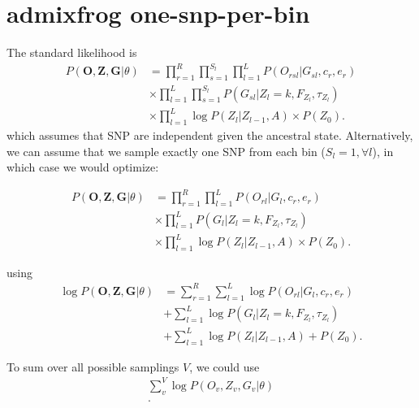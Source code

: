 \documentclass[10pt,a4paper]{article}
\newcommand{\BFZ}{\mathbf{Z}}
\newcommand{\BFG}{\mathbf{G}}
\newcommand{\BFO}{\mathbf{O}}
\begin{document}
\section{admixfrog one-snp-per-bin}
The standard likelihood is
\begin{align}
P(\BFO, \BFZ, \BFG | \theta)  &= \prod_{r=1}^R\prod_{s=1}^{S_l}\prod_{l=1}^L  P(O_{rsl} | G_{sl}, c_r, e_r)\nonumber\\
&\times \prod_{l=1}^L \prod_{s=1}^{S_l}  P(G_{sl} | Z_l = k, F_{Z_l}, \tau_{Z_l})\nonumber\\
&\times \prod_{l=1}^L  \log P(Z_l |Z_{l-1}, A) \times P(Z_0) 
\label{eq:lik:correct}.
\end{align}
which assumes that SNP are independent given the ancestral state. Alternatively, we can assume that we sample exactly one SNP from each bin ($S_l=1,  \forall l$), in which case we would optimize:

\begin{align}
P(\BFO, \BFZ, \BFG | \theta)  &= \prod_{r=1}^R\prod_{l=1}^L  P(O_{rl} | G_{l}, c_r, e_r)\nonumber\\
&\times \prod_{l=1}^L   P(G_{l} | Z_l = k, F_{Z_l}, \tau_{Z_l})\nonumber\\
&\times \prod_{l=1}^L  \log P(Z_l |Z_{l-1}, A) \times P(Z_0) 
\label{eq:lik:onesnp}.
\end{align}

using 
\begin{align}
\log P(\BFO, \BFZ, \BFG | \theta)  &= \sum_{r=1}^R\sum_{l=1}^L  \log P(O_{rl} | G_{l}, c_r, e_r)\nonumber\\
&+ \sum_{l=1}^L   \log P(G_{l} | Z_l = k, F_{Z_l}, \tau_{Z_l})\nonumber\\
&+ \sum_{l=1}^L  \log P(Z_l |Z_{l-1}, A) + P(Z_0) 
\label{eq:ll:onesnp}.
\end{align}

To sum over all possible samplings $V$, we could use
\begin{align}
\sum_v^V \log P(O_v, Z_v, G_v | \theta)\\
\label{eq:ll:onesnp}.
\end{align}

\citep{peter2013, pakes1971}
\citet{peter2010, peter2016, huerta-sanchez2014}




\end{document}
